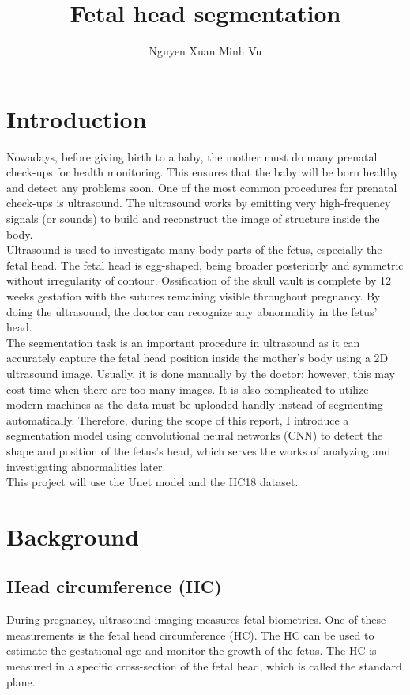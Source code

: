 \documentclass[conference]{IEEEtran}
\title{Fetal head segmentation}
\author{Nguyen Xuan Minh Vu}
\begin{document}
\maketitle

\section{Introduction}

Nowadays, before giving birth to a baby, the mother must do many prenatal check-ups for health monitoring. This ensures that the baby will be born healthy and detect any problems soon. One of the most common procedures for prenatal check-ups is ultrasound. The ultrasound works by emitting very high-frequency signals (or sounds) to build and reconstruct the image of structure inside the body.\\
Ultrasound is used to investigate many body parts of the fetus, especially the fetal head. The fetal head is egg-shaped, being broader posteriorly and symmetric without irregularity of contour. Ossification of the skull vault is complete by 12 weeks gestation with the sutures remaining visible throughout pregnancy. By doing the ultrasound, the doctor can recognize any abnormality in the fetus' head.\\
The segmentation task is an important procedure in ultrasound as it can accurately capture the fetal head position inside the mother's body using a 2D ultrasound image. Usually, it is done manually by the doctor; however, this may cost time when there are too many images. It is also complicated to utilize modern machines as the data must be uploaded handly instead of segmenting automatically. Therefore, during the scope of this report, I introduce a segmentation model using convolutional neural networks (CNN) to detect the shape and position of the fetus's head, which serves the works of analyzing and investigating abnormalities later.\\
This project will use the Unet model and the HC18 dataset.

\section{Background}
\subsection{Head circumference (HC)} During pregnancy, ultrasound imaging measures fetal biometrics. One of these measurements is the fetal head circumference (HC). The HC can be used to estimate the gestational age and monitor the growth of the fetus. The HC is measured in a specific cross-section of the fetal head, which is called the standard plane.
\end{document}
